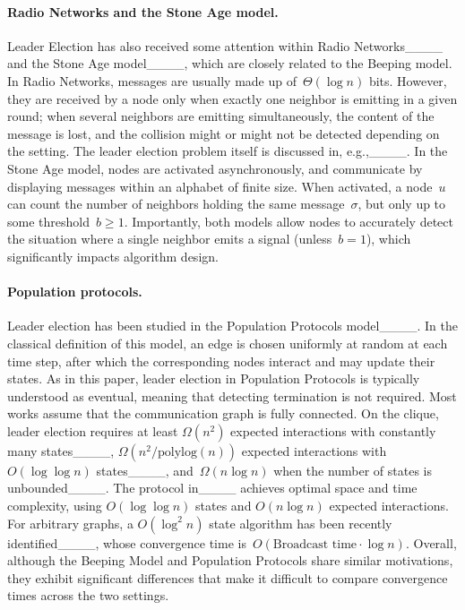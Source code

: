 \paragraph{Radio Networks and the Stone Age model.} Leader Election has also received some attention within Radio Networks____ and the Stone Age model____, which are closely related to the Beeping model.
In Radio Networks, messages are usually made up of~$\Theta(\log n)$ bits. However, they are received by a node only when exactly one neighbor is emitting in a given round; when several neighbors are emitting simultaneously, the content of the message is lost, and the collision might or might not be detected depending on the setting.
The leader election problem itself is discussed in, e.g.,____.
In the Stone Age model, nodes are activated asynchronously, and communicate by displaying messages within an alphabet of finite size. When activated, a node~$u$ can count the number of neighbors holding the same message~$\sigma$, but only up to some threshold~$b \geq 1$.
Importantly, both models allow nodes to accurately detect the situation where a single neighbor emits a signal (unless~$b=1$), which significantly impacts algorithm design.

\paragraph{Population protocols.} 

Leader election has been studied in the Population Protocols model____. In the classical definition of this model, an edge is chosen uniformly at random at each time step, after which the corresponding nodes interact and may update their states.
As in this paper, leader election in Population Protocols is typically understood as eventual, meaning that detecting termination is not required. Most works assume that the communication graph is fully connected.
On the clique, leader election requires at least $\Omega(n^2)$ expected interactions with constantly many states____,
$\Omega(n^2/\mathrm{polylog}(n))$ expected interactions with~$O(\log \log n)$ states____, and~$\Omega(n \log n)$ when the number of states is unbounded____. The protocol in____ achieves optimal space and time complexity, using $O(\log \log n)$ states and $O(n \log n)$ expected interactions.
For arbitrary graphs, a $O(\log^2 n)$ state algorithm has been recently identified____, whose convergence time is~$O(\text{Broadcast time} \cdot \log n)$.
Overall, although the Beeping Model and Population Protocols share similar motivations, they exhibit significant differences that make it difficult to compare convergence times across the two settings.


